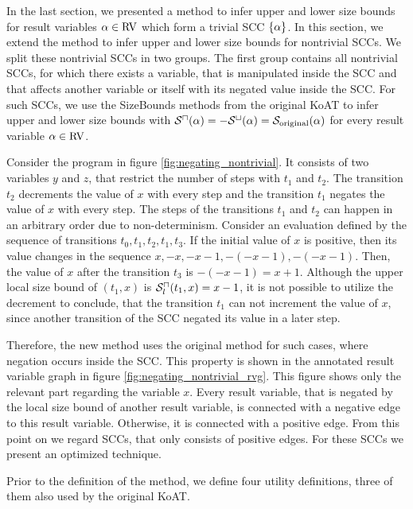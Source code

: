 In the last section, we presented a method to infer upper and lower size bounds for result variables $\alpha \in \text{RV}$ which form a trivial SCC $\lbrace \alpha \rbrace$.
In this section, we extend the method to infer upper and lower size bounds for nontrivial SCCs.
We split these nontrivial SCCs in two groups.
The first group contains all nontrivial SCCs, for which there exists a variable, that is manipulated inside the SCC and that affects another variable or itself with its negated value inside the SCC.
For such SCCs, we use the SizeBounds methods from the original KoAT to infer upper and lower size bounds with ${\mathcal{S}^\sqcap}(\alpha) = -{\mathcal{S}^\sqcup}(\alpha) = \mathcal{S}_{\text{original}}(\alpha)$ for every result variable $\alpha \in \text{RV}$.



Consider the program in figure \ref{fig:negating_nontrivial}.
It consists of two variables $y$ and $z$, that restrict the number of steps with $t_1$ and $t_2$.
The transition $t_2$ decrements the value of $x$ with every step and the transition $t_1$ negates the value of $x$ with every step.
The steps of the transitions $t_1$ and $t_2$ can happen in an arbitrary order due to non-determinism.
Consider an evaluation defined by the sequence of transitions $t_0, t_1, t_2, t_1, t_3$.
If the initial value of $x$ is positive, then its value changes in the sequence $x, -x, -x-1, -(-x-1), -(-x-1)$.
Then, the value of $x$ after the transition $t_3$ is $-(-x-1) = x+1$.
Although the upper local size bound of $(t_1,x)$ is ${\mathcal{S}^\sqcap_l}(t_1,x) = x-1$, it is not possible to utilize the decrement to conclude, that the transition $t_1$ can not increment the value of $x$, since another transition of the SCC negated its value in a later step.



Therefore, the new method uses the original method for such cases, where negation occurs inside the SCC.
This property is shown in the annotated result variable graph in figure \ref{fig:negating_nontrivial_rvg}.
This figure shows only the relevant part regarding the variable $x$.
Every result variable, that is negated by the local size bound of another result variable, is connected with a negative edge to this result variable.
Otherwise, it is connected with a positive edge.
From this point on we regard SCCs, that only consists of positive edges.
For these SCCs we present an optimized technique.

Prior to the definition of the method, we define four utility definitions, three of them also used by the original KoAT.

